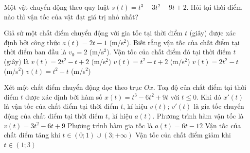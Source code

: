 \begin{bt}%

	Một vật chuyển động theo quy luật $s(t)=t^3-3t^2-9t+2$. Hỏi tại thời điểm nào thì vận tốc của vật đạt giá trị nhỏ nhất?
	
\end{bt}

\begin{ex}%
	Giả sử một chất điểm chuyển động với gia tốc  tại thời điểm $t$ (giây) được xác định bởi công thức $a(t)=2t-1$ (m/s$^2$). Biết rằng vận tốc của chất điểm tại thời điểm ban đầu là $v_0=2$ (m/s$^2$). Vận tốc của chất điểm đó tại thời điểm $t$ (giây) là
	 \choice
		{$v(t)=2t^2-t+2$ (m/s$^2$)} 
		{\True $v(t)=t^2-t+2$ (m/s$^2$)} 
		 {$v(t)=2t^2-t$ (m/s$^2$)}
		{$v(t)=t^2-t$ (m/s$^2$)} 
\end{ex}

\begin{ex}%
		Xét một chất điểm chuyển động dọc theo trục $Ox$. Toạ độ của chất điểm tại thời điểm $t$ được xác định bởi hàm số $x(t)=t^3-6t^2+9t$ với $t \leq 0$. Khi đó $x'(t)$ là vận tốc của chất điểm tại thời điểm $t$, kí hiệu $v(t)$; $v'(t)$ là gia tốc chuyển động của chất điểm tại thời điểm $t$, kí hiệu  $a(t)$.
	\choiceTF 
			{Phương trình hàm vận tốc là $v(t) =  3t^2-6t+9$}
			{\True Phương trình hàm gia tốc là  $a(t)=6t-12$}
			{\True Vận tốc của chất điểm  tăng khi $t \in (0;1)\cup (3;+\infty)$}
			{\True Vận tốc của chất điểm giảm khi  $t \in (1;3)$}
	\end{ex}

